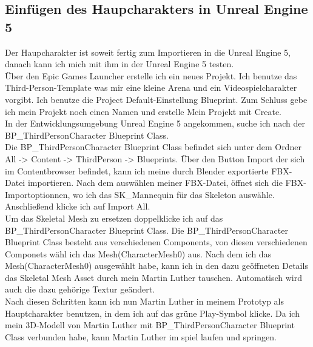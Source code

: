 \subsection{Einfügen des Haupcharakters in Unreal Engine 5}
Der Haupcharakter ist soweit fertig zum Importieren in die Unreal Engine 5, danach kann ich mich mit ihm in der Unreal Engine 5 testen.
\\
Über den Epic Games Launcher erstelle ich ein neues Projekt. Ich benutze das Third-Person-Template was mir eine kleine Arena und ein Videospielcharakter vorgibt. Ich benutze die Project Default-Einstellung Blueprint. Zum Schluss gebe ich mein Projekt noch einen Namen und erstelle Mein Projekt mit Create.
\\
In der Entwicklungsumgebung Unreal Engine 5 angekommen, suche ich nach der BP\_ThirdPersonCharacter Blueprint Class.
\\
Die BP\_ThirdPersonCharacter Blueprint Class befindet sich unter dem Ordner All -> Content -> ThirdPerson -> Blueprints. Über den Button Import der sich im Contentbrowser befindet, kann ich meine durch Blender exportierte FBX-Datei importieren. Nach dem auswählen meiner FBX-Datei, öffnet sich die FBX-Importoptionnen, wo ich das SK\_Mannequin für das Skeleton auswähle. Anschließend klicke ich auf Import All.
\\
Um das Skeletal Mesh zu ersetzen doppelklicke ich auf das BP\_ThirdPersonCharacter Blueprint Class. Die BP\_ThirdPersonCharacter Blueprint Class besteht aus verschiedenen Components, von diesen verschiedenen Componets wähl ich das Mesh(CharacterMesh0) aus. Nach dem ich das Mesh(CharacterMesh0) ausgewählt habe, kann ich in den dazu geöffneten Details das Skeletal Mesh Asset durch mein Martin Luther tauschen. Automatisch wird auch die dazu gehörige Textur geändert.
\\
Nach diesen Schritten kann ich nun Martin Luther in meinem Prototyp als Hauptcharakter benutzen, in dem ich auf das grüne Play-Symbol klicke. Da ich mein 3D-Modell von Martin Luther mit BP\_ThirdPersonCharacter Blueprint Class verbunden habe, kann Martin Luther im spiel laufen und springen.

%
%
